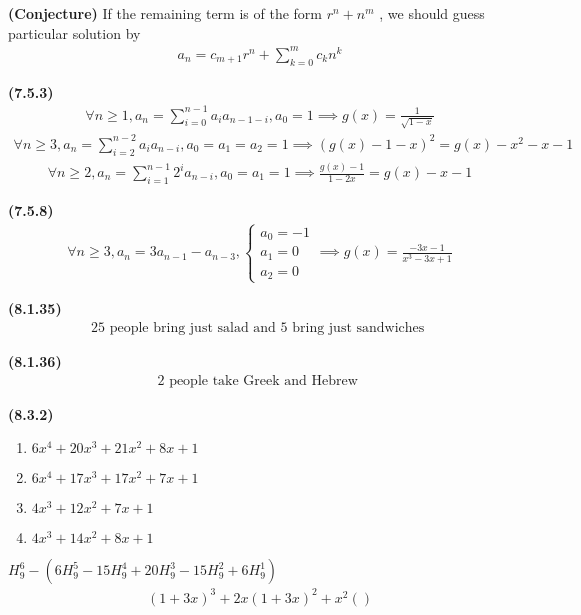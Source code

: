 \documentclass{report}
\begin{document}
\begin{theorem}
\textbf{(Conjecture)} If the remaining term is of the form $r^n+n^m$ , we should guess particular solution by 
\begin{align*}
a_n= c_{m+1} r^n + \sum_{k=0}^m c_k n^k
\end{align*}
\end{theorem}
\begin{theorem}
\textbf{(7.5.3)} 
\begin{align*}
\forall n\geq 1,a_n=\sum_{i=0}^{n-1}a_i a_{n-1-i}, a_0=1 \implies g(x)=\frac{1}{\sqrt{1-x} }
\end{align*}
\begin{align*}
\forall n\geq 3, a_n=\sum_{i=2}^{n-2}a_i a_{n-i},a_0=a_1=a_2=1 \implies (g(x)-1-x)^2=g(x)-x^2-x-1
\end{align*}
\begin{align*}
\forall n\geq 2, a_n=\sum_{i=1}^{n-1} 2^i a_{n-i},a_0=a_1=1 \implies \frac{g(x)-1}{1-2x} =g(x)-x-1
\end{align*}
\end{theorem}
\begin{theorem}
\textbf{(7.5.8)}
\begin{align*}
\forall n\geq 3, a_n=3a_{n-1}-a_{n-3}, \begin{cases}
  a_0=-1\\
  a_1=0\\
  a_2=0
\end{cases}\implies g(x)=\frac{-3x-1}{x^3-3x+1}
\end{align*}
\end{theorem}
\begin{theorem}
\textbf{(8.1.35)}
\begin{align*}
25\text{ people bring just salad and $5$ bring just sandwiches }
\end{align*}
\end{theorem}
\begin{theorem}
\textbf{(8.1.36)}
\begin{align*}
2\text{ people take Greek and Hebrew }
\end{align*}
\end{theorem}
\begin{theorem}
\textbf{(8.3.2)}
\begin{enumerate}[label=(\alph*)]
  \item $6x^4+20x^3+21x^2+8x+1$
  \item $6x^4+17x^3+17x^2+7x+1$ 
  \item $4x^3+12x^2+7x+1$ 
  \item $4x^3+14x^2+8x+1$
\end{enumerate}
$H^6_9 - (6H^5_9 - 15 H^4_9 +20 H^3_9 - 15 H^2_9 + 6 H^1_9)$
\begin{align*}
  (1+3x)^3+2x(1+3x)^2+x^2()
\end{align*}
\end{theorem}
\end{document}
